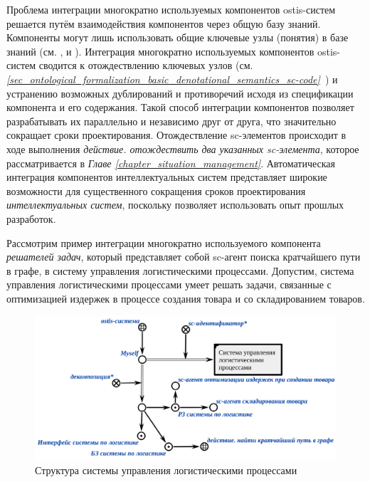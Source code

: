 Проблема интеграции многократно используемых компонентов ostis-систем решается путём взаимодействия компонентов через общую базу знаний. Компоненты могут лишь использовать общие ключевые узлы (понятия) в базе знаний (см. ,  и ). Интеграция многократно используемых компонентов ostis-систем сводится к отождествлению ключевых узлов (см. \textit{\ref{sec_ontological_formalization_basic_denotational_semantics_sc-code}~}) и устранению возможных дублирований и противоречий исходя из спецификации компонента и его содержания. Такой способ интеграции компонентов позволяет разрабатывать их параллельно и независимо друг от друга, что значительно сокращает сроки проектирования. Отождествление sc-элементов происходит в ходе выполнения \textit{действие. отождествить два указанных sc-элемента}, которое рассматривается в \textit{Главе \ref{chapter_situation_management}}. Автоматическая интеграция компонентов интеллектуальных систем представляет широкие возможности для существенного сокращения сроков проектирования \textit{интеллектуальных систем}, поскольку позволяет использовать опыт прошлых разработок.

Рассмотрим пример интеграции многократно используемого компонента \textit{решателей задач}, который представляет собой sc-агент поиска кратчайшего пути в графе, в систему управления логистическими процессами. Допустим, система управления логистическими процессами умеет решать задачи, связанные с оптимизацией издержек в процессе создания товара и со складированием товаров. 

\begin{figure}[H]
	\includegraphics[scale=0.5]{author/part5/figures/logistics_system.png}
	\caption{Структура системы управления логистическими процессами}
	\label{fig:logistics_system}
\end{figure}

